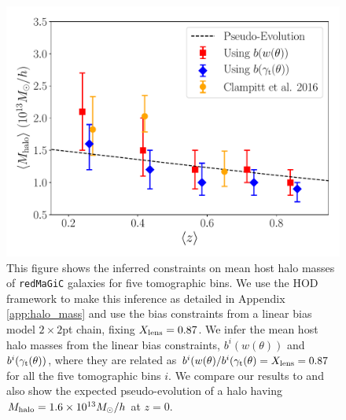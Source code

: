 \documentclass[aps, prd,twocolumn,superscriptaddress,nofootinbib,preprintnumbers]{revtex4-1}
\newcommand{\redmagic}{\texttt{redMaGiC} }
\newcommand{\SP}[1]{{\color{red}[SP: #1]}}
\newcommand{\blue}[1]{\textcolor{blue}{#1}}
\begin{document}
\begin{figure}
\includegraphics[width=\columnwidth]{figs/M_const.pdf}
\caption[]{
This figure shows the inferred constraints on mean host halo masses of \redmagic galaxies for five tomographic bins. We use the HOD framework to make this inference as detailed in Appendix \ref{app:halo_mass} and use the bias constraints from a linear bias model $2\times2$pt chain, fixing $X_{\rm lens} = 0.87$. We infer the mean host halo masses from the linear bias constraints, $b^{i}(w(\theta))$ and $b^{i}(\gamma_{\rm t}(\theta))$, where they are related as $b^{i}(w(\theta)/b^{i}(\gamma_{\rm t}(\theta) = X_{\rm lens} = 0.87$ for all the five tomographic bins $i$. We compare our results to \citet{Clampitt_2016} and also show the expected pseudo-evolution of a halo having $M_{\rm halo} = 1.6\times 10^{13} M_{\odot}/h$ at $z=0$. 
}
\label{fig:bias_mass_nbar}
\end{figure}
\end{document}
